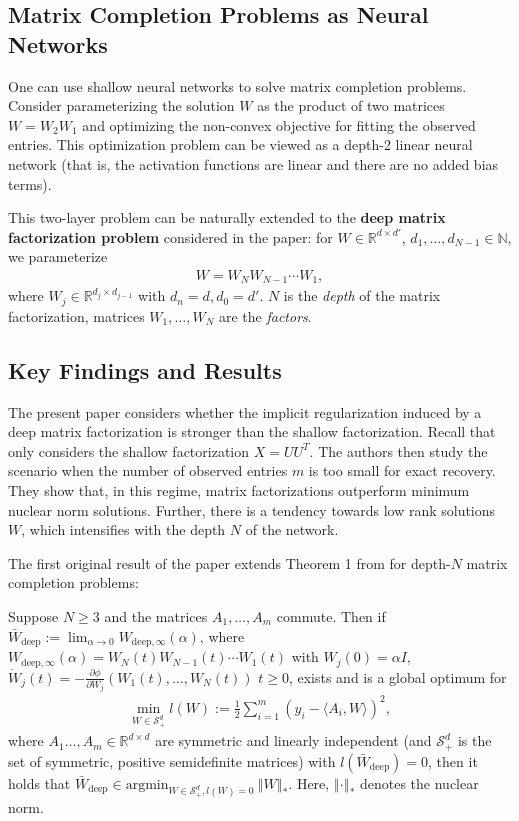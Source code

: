 \documentclass{article}
\newenvironment{manualtheorem}[1]{%
  \renewcommand\themanualtheoreminner{#1}%
  \manualtheoreminner
}{\endmanualtheoreminner}
\begin{document}
\subsection{Matrix Completion Problems as Neural Networks}
One can use shallow neural networks to solve matrix completion problems. Consider parameterizing the solution $W$ as the product of two matrices $W = W_2 W_1$ and optimizing the non-convex objective for fitting the observed entries. This optimization problem can be viewed as a depth-2 linear neural network (that is, the activation functions are linear and there are no added bias terms).

This two-layer problem can be naturally extended to the \textbf{deep matrix factorization problem} considered in the paper: for $W \in \mathbb{R}^{d \times d'}$, $d_1, \ldots, d_{N-1} \in \mathbb{N}$, we parameterize
\begin{align*}
    W = W_N W_{N-1} \cdots W_1,
\end{align*}
where $W_j \in \mathbb{R}^{d_j \times d_{j-1}}$ with $d_n = d, d_0 = d'$. $N$ is the \textit{depth} of the matrix factorization, matrices $W_1, \ldots, W_N$ are the \textit{factors}.

\subsection{Key Findings and Results}
The present paper considers whether the implicit regularization induced by a deep matrix factorization is stronger than the shallow factorization. Recall that \cite{gunasekar2018implicit} only considers the shallow factorization $X = UU^T$. The authors then study the scenario when the number of observed entries $m$ is too small for exact recovery. They show that, in this regime, matrix factorizations outperform minimum nuclear norm solutions. Further, there is a tendency towards low rank solutions $W$, which intensifies with the depth $N$ of the network. 

The first original result of the paper extends Theorem 1 from \cite{gunasekar2018implicit} for depth-$N$ matrix completion problems:
\begin{manualtheorem}{2}
Suppose $N \geq 3$ and the matrices $A_1, \ldots, A_m$ commute. Then if $\bar{W}_{\text{deep}} := \lim_{\alpha \rightarrow 0} W_{\text{deep}, \infty}(\alpha)$, where $ W_{\text{deep}, \infty}(\alpha) = W_N(t) W_{N-1}(t) \cdots W_1(t)$ with $W_j(0) = \alpha I$, $\dot{W}_j(t) = -\frac{\partial \phi}{\partial W_j}(W_1(t), \ldots, W_N(t))$ $t \geq 0$, exists and is a global optimum for
\begin{align*}
    \min_{W \in \mathcal{S}_+^d} l(W) := \frac{1}{2} \sum_{i=1}^m (y_i - \langle A_i, W \rangle)^2,
\end{align*}
where $A_1 \ldots, A_m \in \mathbb{R}^{d \times d}$ are symmetric and linearly independent (and $\mathcal{S}_+^d$ is the set of symmetric, positive semidefinite matrices) with $l(\bar{W}_{\text{deep}}) = 0$, then it holds that $\bar{W}_{\text{deep}} \in \text{argmin}_{W \in \mathcal{S}_+^d, l(W) = 0} \ \left\Vert W \right\Vert_*.$ Here, $\left\Vert \cdot \right\Vert_*$ denotes the nuclear norm.
\end{manualtheorem}
\end{document}
